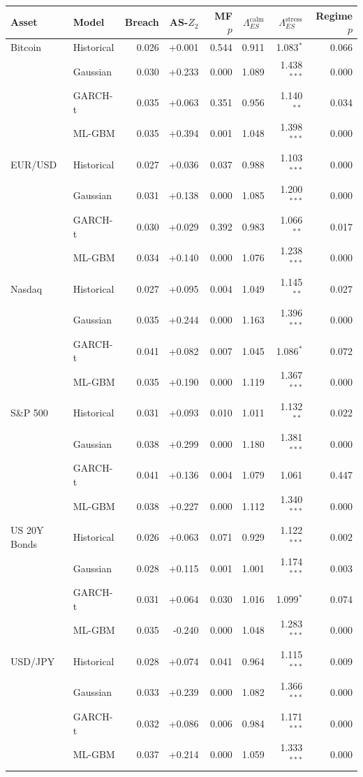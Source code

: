 \begin{tabular}{llrrrrrr}
\toprule
Asset & Model & Breach & AS-$Z_2$ & MF $p$ & $\Lambda_{ES}^{\text{calm}}$ & $\Lambda_{ES}^{\text{stress}}$ & Regime $p$ \\
\midrule
Bitcoin & Historical & 0.026 & +0.001 & 0.544 & 0.911 & 1.083$^{*}$ & 0.066 \\
 & Gaussian & 0.030 & +0.233 & 0.000 & 1.089 & 1.438$^{***}$ & 0.000 \\
 & GARCH-t & 0.035 & +0.063 & 0.351 & 0.956 & 1.140$^{**}$ & 0.034 \\
 & ML-GBM & 0.035 & +0.394 & 0.001 & 1.048 & 1.398$^{***}$ & 0.000 \\
EUR/USD & Historical & 0.027 & +0.036 & 0.037 & 0.988 & 1.103$^{***}$ & 0.000 \\
 & Gaussian & 0.031 & +0.138 & 0.000 & 1.085 & 1.200$^{***}$ & 0.000 \\
 & GARCH-t & 0.030 & +0.029 & 0.392 & 0.983 & 1.066$^{**}$ & 0.017 \\
 & ML-GBM & 0.034 & +0.140 & 0.000 & 1.076 & 1.238$^{***}$ & 0.000 \\
Nasdaq & Historical & 0.027 & +0.095 & 0.004 & 1.049 & 1.145$^{**}$ & 0.027 \\
 & Gaussian & 0.035 & +0.244 & 0.000 & 1.163 & 1.396$^{***}$ & 0.000 \\
 & GARCH-t & 0.041 & +0.082 & 0.007 & 1.045 & 1.086$^{*}$ & 0.072 \\
 & ML-GBM & 0.035 & +0.190 & 0.000 & 1.119 & 1.367$^{***}$ & 0.000 \\
S\&P 500 & Historical & 0.031 & +0.093 & 0.010 & 1.011 & 1.132$^{**}$ & 0.022 \\
 & Gaussian & 0.038 & +0.299 & 0.000 & 1.180 & 1.381$^{***}$ & 0.000 \\
 & GARCH-t & 0.041 & +0.136 & 0.004 & 1.079 & 1.061 & 0.447 \\
 & ML-GBM & 0.038 & +0.227 & 0.000 & 1.112 & 1.340$^{***}$ & 0.000 \\
US 20Y Bonds & Historical & 0.026 & +0.063 & 0.071 & 0.929 & 1.122$^{***}$ & 0.002 \\
 & Gaussian & 0.028 & +0.115 & 0.001 & 1.001 & 1.174$^{***}$ & 0.003 \\
 & GARCH-t & 0.031 & +0.064 & 0.030 & 1.016 & 1.099$^{*}$ & 0.074 \\
 & ML-GBM & 0.035 & -0.240 & 0.000 & 1.048 & 1.283$^{***}$ & 0.000 \\
USD/JPY & Historical & 0.028 & +0.074 & 0.041 & 0.964 & 1.115$^{***}$ & 0.009 \\
 & Gaussian & 0.033 & +0.239 & 0.000 & 1.082 & 1.366$^{***}$ & 0.000 \\
 & GARCH-t & 0.032 & +0.086 & 0.006 & 0.984 & 1.171$^{***}$ & 0.000 \\
 & ML-GBM & 0.037 & +0.214 & 0.000 & 1.059 & 1.333$^{***}$ & 0.000 \\
\bottomrule
\end{tabular}